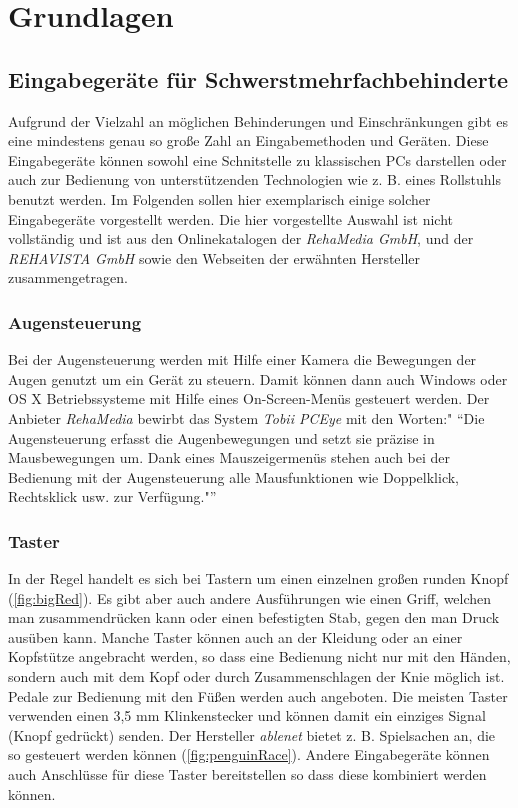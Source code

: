 \section{Grundlagen}

	\subsection{Eingabegeräte für Schwerstmehrfachbehinderte}
    \label{sec:input-devices}
    
    	Aufgrund der Vielzahl an möglichen Behinderungen und Einschränkungen gibt es eine mindestens genau so große Zahl an Eingabemethoden und Geräten. Diese Eingabegeräte können sowohl eine Schnitstelle zu klassischen PCs darstellen oder auch zur Bedienung von unterstützenden Technologien wie z. B. eines Rollstuhls benutzt werden. Im Folgenden sollen hier exemplarisch einige solcher Eingabegeräte vorgestellt werden. Die hier vorgestellte Auswahl ist nicht vollständig und ist aus den Onlinekatalogen der \emph{RehaMedia GmbH}, und der \emph{REHAVISTA GmbH} sowie den Webseiten der erwähnten Hersteller zusammengetragen.
        
        \subsubsection*{Augensteuerung}
        	Bei der Augensteuerung werden mit Hilfe einer Kamera die Bewegungen der Augen genutzt um ein Gerät zu steuern. Damit können dann auch Windows oder OS X Betriebssysteme mit Hilfe eines On-Screen-Menüs gesteuert werden. Der Anbieter \emph{RehaMedia} bewirbt das System \emph{Tobii PCEye} mit den Worten:" \enquote{Die Augensteuerung erfasst die Augenbewegungen und setzt sie präzise in Mausbewegungen um. Dank eines Mauszeigermenüs stehen auch bei der Bedienung mit der Augensteuerung alle Mausfunktionen wie Doppelklick, Rechtsklick usw. zur Verfügung."} \parencite{rehamedia:TobiiPCEyeGo}
            
         \subsubsection*{Taster}
         	In der Regel handelt es sich bei Tastern um einen einzelnen großen runden Knopf (\autoref{fig:bigRed}). Es gibt aber auch andere Ausführungen wie einen Griff, welchen man zusammendrücken kann oder einen befestigten Stab, gegen den man Druck ausüben kann. Manche Taster können auch an der Kleidung oder an einer Kopfstütze angebracht werden, so dass eine Bedienung nicht nur mit den Händen, sondern auch mit dem Kopf oder durch  Zusammenschlagen der Knie möglich ist. Pedale zur Bedienung mit den Füßen werden auch angeboten. Die meisten Taster verwenden einen 3,5 mm Klinkenstecker und können damit ein einziges Signal (Knopf gedrückt) senden. Der Hersteller \emph{ablenet} bietet z. B. Spielsachen an, die so gesteuert werden können (\autoref{fig:penguinRace}). Andere Eingabegeräte können auch Anschlüsse für diese Taster bereitstellen so dass diese kombiniert werden können.  
         	
